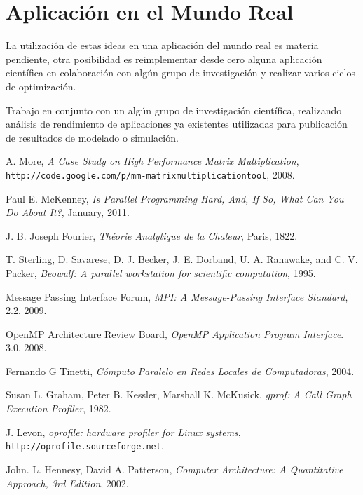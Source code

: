 \documentclass[a4paper]{report}
\begin{document}
\section{Aplicaci\'on en el Mundo Real}

La utilizaci\'on de estas ideas en una aplicaci\'on del mundo real es materia
pendiente, otra posibilidad es reimplementar desde cero alguna aplicaci\'on
cient\'ifica en colaboraci\'on con alg\'un grupo de investigaci\'on y realizar
varios ciclos de optimizaci\'on.

\bigskip

Trabajo en conjunto con un alg\'un grupo de investigaci\'on cient\'ifica,
realizando an\'alisis de rendimiento de aplicaciones ya existentes utilizadas
para publicaci\'on de resultados de modelado o simulaci\'on.

\begin{thebibliography}{9}

  A. More,
  \emph{A Case Study on High Performance Matrix Multiplication},
  {\tt http://code.google.com/p/mm-matrixmultiplicationtool},
  2008.

  Paul E. McKenney,
  \emph{Is Parallel Programming Hard, And, If So, What Can You Do About It?},
  January, 2011.

  J. B. Joseph Fourier, \emph{Th\'eorie Analytique de la Chaleur}, Paris, 1822.

  T. Sterling, D. Savarese, D. J. Becker, J. E. Dorband, U. A. Ranawake,
  and C. V. Packer,
  \emph{Beowulf: A parallel workstation for scientific computation},
  1995.

  Message Passing Interface Forum,
  \emph{MPI: A Message-Passing Interface Standard},
  2.2,
  2009.

  OpenMP Architecture Review Board,
  \emph{OpenMP Application Program Interface}.
  3.0,
  2008.

  Fernando G Tinetti,
  \emph{C\'omputo Paralelo en Redes Locales de Computadoras},
  2004.

  Susan L. Graham,  Peter B. Kessler,  Marshall K. McKusick,
  \emph{gprof: A Call Graph Execution Profiler},
  1982.
  
  J. Levon,
  \emph{oprofile: hardware profiler for Linux systems},
       {\tt http://oprofile.sourceforge.net}.
  
  John. L. Hennesy, David A. Patterson,
  \emph{Computer Architecture: A Quantitative Approach, 3rd Edition},
  2002.


\end{thebibliography}
\end{document}
